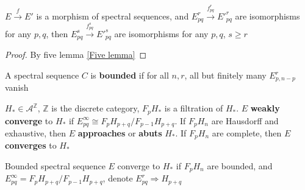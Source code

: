 \documentclass[../main.tex]{subfiles}
\begin{document}
\begin{lemma}
$E\xrightarrow fE'$ is a morphism of spectral sequences, and $E^r_{pq}\xrightarrow{f^r_{pq}}E'^r_{pq}$ are isomorphisms for any $p,q$, then $E^s_{pq}\xrightarrow{f^s_{pq}}E'^s_{pq}$ are isomorphisms for any $p,q$, $s\geq r$
\end{lemma}

\begin{proof}
By five lemma \ref{Five lemma}
\end{proof}

\begin{definition}
A spectral sequence $C$ is \textbf{bounded} if for all $n,r$, all but finitely many $E^r_{p,n-p}$ vanish
\end{definition}

\begin{definition}
$H_*\in \mathscr A^\mathbb Z$, $\mathbb Z$ is the discrete category, $F_pH_*$ is a filtration of $H_*$. $E$ \textbf{weakly converge} to $H_*$ if $E^\infty_{pq}\cong F_pH_{p+q}/F_{p-1}H_{p+q}$. If $F_pH_n$ are Hausdorff and exhaustive, then $E$ \textbf{approaches} or \textbf{abuts} $H_*$. If $F_pH_n$ are complete, then $E$ \textbf{converges} to $H_*$ \par
Bounded spectral sequence $E$ converge to $H_*$ if $F_pH_n$ are bounded, and $E^\infty_{pq}=F_pH_{p+q}/F_{p-1}H_{p+q}$, denote $E^r_{pq}\Rightarrow H_{p+q}$
\end{definition}
\end{document}
